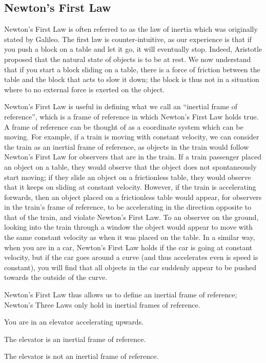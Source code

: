 \subsection{Newton's First Law}
Newton's First Law is often referred to as the law of inertia which was originally stated by Galileo. The first law is counter-intuitive, as our experience is that if you push a block on a table and let it go, it will eventually stop. Indeed, Aristotle proposed that the natural state of objects is to be at rest. We now understand that if you start a block sliding on a table, there is a force of friction between the table and the block that acts to slow it down; the block is thus not in a situation where to no external force is exerted on the object.

Newton's First Law is useful in defining what we call an ``inertial frame of reference'', which is a frame of reference in which Newton's First Law holds true. A frame of reference can be thought of as a coordinate system which can be moving. For example, if a train is moving with constant velocity, we can consider the train as an inertial frame of reference, as objects in the train would follow Newton's First Law for observers that are in the train. If a train passenger placed an object on a table, they would observe that the object does not spontaneously start moving; if they slide an object on a frictionless table, they would observe that it keeps on sliding at constant velocity. However, if the train is accelerating forwards, then an object placed on a frictionless table would appear, for observers in the train's frame of reference, to be accelerating in the direction opposite to that of the train, and violate Newton's First Law. To an observer on the ground, looking into the train through a window the object would appear to move with the same constant velocity as when it was placed on the table. In a similar way, when you are in a car, Newton's First Law holds if the car is going at constant velocity, but if the car goes around a curve (and thus accelerates even is speed is constant), you will find that all objects in the car suddenly appear to be pushed towards the outside of the curve.

Newton's First Law thus allows us to define an inertial frame of reference; Newton's Three Laws only hold in inertial frames of reference.

\begin{checkpointMC}{You are in an elevator accelerating upwards.}
\item The elevator is an inertial frame of reference.
\item The elevator is not an inertial frame of reference.%
\end{checkpointMC}

